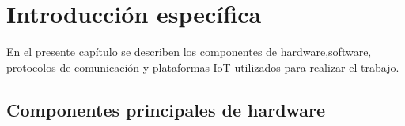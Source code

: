 \chapter{Introducción específica} %

\label{Chapter2}

En el presente capítulo se describen los componentes de hardware,software, protocolos de comunicación y plataformas IoT utilizados para realizar el trabajo.

\section{Componentes principales de hardware}
\label{sec:ejemplo}


